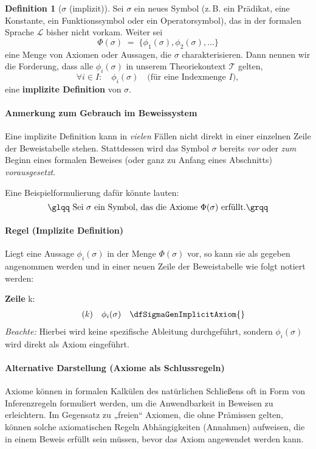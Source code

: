 \documentclass{book}
\theoremstyle{plain}
\theoremstyle{remark}
\theoremstyle{definition}
\newtheorem{definition}{Definition}[section]
\begin{document}
\begin{definition}[\(\sigma\) (implizit)]
\label{dfSigmaGenImplicitAxiom}
Sei \(\sigma\) ein neues Symbol (z.\,B. ein Prädikat, eine Konstante, ein Funktionssymbol oder ein Operatorsymbol), das in der formalen Sprache \(\mathcal{L}\) bisher nicht vorkam. Weiter sei
\[
\Phi(\sigma) \;=\; \{\phi_1(\sigma), \phi_2(\sigma), \dots\}
\]
eine Menge von Axiomen oder Aussagen, die \(\sigma\) charakterisieren. Dann nennen wir die Forderung, dass alle \(\phi_i(\sigma)\) in unserem Theoriekontext \(\mathcal{T}\) gelten,
\[
\forall i \in I:\quad \phi_i(\sigma) \quad \text{(für eine Indexmenge }I\text{)},
\]
eine \textbf{implizite Definition} von \(\sigma\).
\end{definition}

\paragraph{Anmerkung zum Gebrauch im Beweissystem}
Eine implizite Definition kann in \emph{vielen} Fällen nicht direkt in einer einzelnen Zeile der Beweistabelle stehen. Stattdessen wird das Symbol \(\sigma\) bereits \emph{vor} oder \emph{zum} Beginn eines formalen Beweises (oder ganz zu Anfang eines Abschnitts) \emph{vorausgesetzt}. 

Eine Beispielformulierung dafür könnte lauten:
\[
\text{\glqq Sei }\sigma\text{ ein Symbol, das die Axiome }\Phi(\sigma)\text{ erfüllt.\grqq}
\]

\paragraph{Regel (Implizite Definition)}
Liegt eine Aussage \(\phi_i(\sigma)\) in der Menge \(\Phi(\sigma)\) vor, so kann sie als gegeben angenommen werden und in einer neuen Zeile der Beweistabelle wie folgt notiert werden:

\textbf{Zeile }k:
\[
\begin{array}{llll}
   \ & (k) & \phi_i(\sigma) & \dfSigmaGenImplicitAxiom{} \\
\end{array}
\]
\emph{Beachte:} Hierbei wird keine spezifische Ableitung durchgeführt, sondern \(\phi_i(\sigma)\) wird direkt als Axiom eingeführt.

\paragraph{Alternative Darstellung (Axiome als Schlussregeln)}
Axiome können in formalen Kalkülen des natürlichen Schließens oft in Form von Inferenzregeln formuliert werden, um die Anwendbarkeit in Beweisen zu erleichtern. Im Gegensatz zu „freien“ Axiomen, die ohne Prämissen gelten, können solche axiomatischen Regeln Abhängigkeiten (Annahmen) aufweisen, die in einem Beweis erfüllt sein müssen, bevor das Axiom angewendet werden kann.
\end{document}
